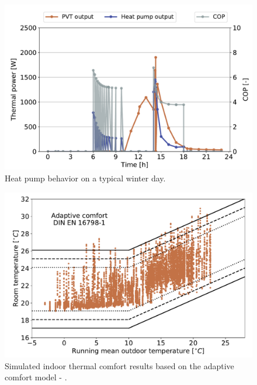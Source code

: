 \documentclass[twocolumn, a4paper,10pt]{article}
\begin{document}
\begin{figure}[H]
\vspace{-5pt} 
\centering
\includegraphics[scale=0.34]{img/HDU_HPop.pdf}
\caption{Heat pump behavior on a typical winter day.}
\label{fig:HDU_HPop}
\end{figure}

\begin{figure}[H]
\centering
\includegraphics[scale=0.34]{img/HDU_adcomf.pdf}
\caption{Simulated indoor thermal comfort results based on the adaptive comfort model - \cite{DIN16798}.}
\label{fig:HDU_adcomf}
\end{figure}
\end{document}
